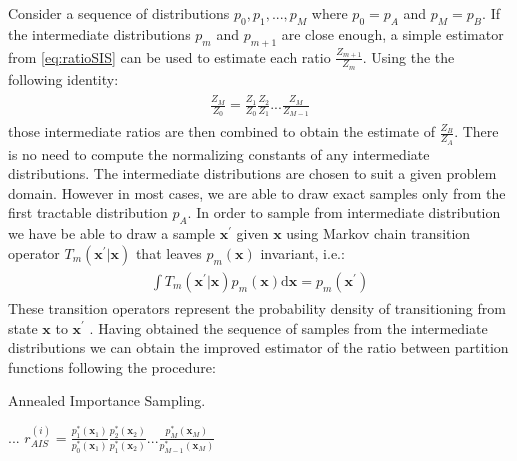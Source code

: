 \documentclass[../report/report.tex]{subfiles}
\begin{document}
Consider a sequence of distributions $p_0, p_1, ..., p_M$ where $p_0 = p_A$ and $p_M = p_B$. If the intermediate distributions $p_{m}$ and $p_{m+1}$ are close enough, a simple estimator from \ref{eq:ratioSIS} can be used to estimate each ratio $\frac{Z_{m+1}}{Z_m}$. Using the the following identity: 
\begin{align}
\begin{split}
\frac{Z_M}{Z_0} = \frac{Z_1}{Z_0}\frac{Z_2}{Z_1}... \frac{Z_M}{Z_{M-1}}
\end{split}
\end{align}
those intermediate ratios are then combined to obtain the estimate of $\frac{Z_B}{Z_A}$. There is no need to compute the normalizing constants of any intermediate distributions. The intermediate distributions are chosen to suit a given problem domain. However in most cases, we are able to draw exact samples only from the first tractable distribution $p_A$. In order to sample from intermediate distribution we have be able to draw a sample $\mathbf{x}^{'}$ given $\mathbf{x}$ using Markov chain transition operator $T_m(\mathbf{x}^{'} |\mathbf{x}) $ that leaves $p_m(\mathbf{x})$ invariant, i.e.:
 \begin{align}
\begin{split}
\int T_m(\mathbf{x}^{'} |\mathbf{x}) p_m(\mathbf{x})\text{d}\mathbf{x} = p_m(\mathbf{x}^{'})
\end{split}
\end{align}
These transition operators represent the probability density of transitioning from state $\mathbf{x}$ to $\mathbf{x}^{'}$ \cite{salakhutdinov2008learning}. Having obtained the sequence of samples from the intermediate distributions we can obtain the improved estimator of the ratio between partition functions following the procedure:
\begin{algorithm}[!bthp]
\caption{Annealed Importance Sampling.}
\label{alg:vae}
\begin{algorithmic}
\State ...
\State $r^{(i)}_{AIS} = \frac{ p^*_1(\mathbf{x}_1) }{ p^*_0(\mathbf{x}_1) }\frac{ p^*_2(\mathbf{x}_2) }{ p^*_1(\mathbf{x}_2) } ... \frac{ p^*_M(\mathbf{x}_M) }{ p^*_{M-1}
(\mathbf{x}_M) }$
\EndFor
\end{algorithmic}
\end{algorithm}
\end{document}
